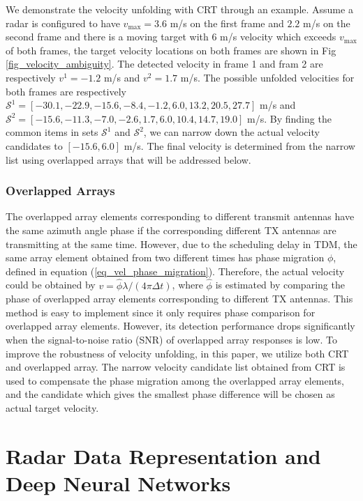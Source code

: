\documentclass[conference]{IEEEtran}
\begin{document}
We demonstrate the velocity unfolding with CRT through an example.
Assume a radar is configured to have $v_{\max} = 3.6 $ m/s  on the first frame and $2.2 $ m/s on the second frame and there is a moving target with $6 $ m/s velocity which exceeds $v_{\max}$ of both frames, the target velocity locations on both frames are shown in Fig \ref{fig_velocity_ambiguity}. The detected velocity in frame 1 and fram 2 are respectively  $v^1 =-1.2$ m/s and $v^2=1.7$ m/s. 
The possible unfolded velocities for both frames are respectively $   {\mathcal S}^1 = \left [-30.1, -22.9, -15.6, -8.4, -1.2, 6.0, 13.2, 20.5, 27.7 \right] $ m/s and $    {\mathcal S}^2  = \left[-15.6, -11.3, -7.0, -2.6, 1.7, 6.0, 10.4, 14.7, 19.0 \right]$ m/s.
By finding the common items in sets ${\mathcal S}^1$ and ${\mathcal S}^2$, we can narrow down the actual velocity candidates to $\left[ -15.6, 6.0\right]$ m/s. The final velocity  is determined from the narrow list using overlapped arrays that will be addressed below.  



\subsubsection{Overlapped Arrays}
The overlapped array elements corresponding to different transmit antennas have the same azimuth angle phase if the corresponding different TX antennas are transmitting at the same time. 
However, due to the scheduling delay in TDM, the same array element obtained from two different times has phase migration $\phi$, defined in equation (\ref{eq_vel_phase_migration}).  
Therefore, the actual velocity could be obtained by $v = \hat \phi \lambda / (4 \pi\Delta t)$, where $\hat \phi$ is estimated by comparing the phase of overlapped array elements corresponding to different TX antennas. 
This method is easy to implement since it only requires phase comparison for overlapped array elements. However, its detection performance drops significantly when the signal-to-noise ratio (SNR) of overlapped array responses is low. To improve the robustness of velocity unfolding, in this paper, we utilize both CRT and overlapped array.
The narrow velocity candidate list obtained from CRT is used to compensate the phase migration among the overlapped array elements, and the candidate which gives the smallest phase difference will be chosen as actual target velocity. 



\section{Radar Data Representation and Deep Neural Networks}
\end{document}

